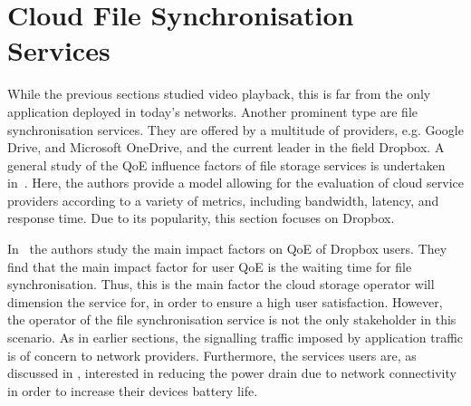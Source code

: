 \section{Cloud File Synchronisation Services}\label{sec:application:cloud_file_synchronisation}

\newcommand{\dropbox}{\emph{DropBox}\xspace}
\newcommand{\imageFileSize}{\ensuremath{S_I}\xspace}
\newcommand{\imageArrivalRate}{\ensuremath{\lambda_I}\xspace}
\newcommand{\panTransferRate}{\ensuremath{B_{P}}\xspace}
\newcommand{\interarrivaltime}{\ensuremath{t_I}\xspace}
\newcommand{\clientpreparationtime}{\ensuremath{C}\xspace}
\newcommand{\uploadbandwidth}{\ensuremath{B_U}\xspace}
\newcommand{\idleThreshold}{\ensuremath{\tau}\xspace}
\newcommand{\serverpreparationtime}{\ensuremath{S}\xspace}
\newcommand{\downloadbandwidth}{\ensuremath{B_D}\xspace}
\newcommand{\startupDelay}{\ensuremath{\sigma}\xspace}
\newcommand{\sojournTime}{\ensuremath{\Sigma}\xspace}
\newcommand{\relativeDisconnectedTime}{\ensuremath{\Delta}\xspace}
\newcommand{\connectionCount}{\ensuremath{K}\xspace}
\newcommand{\algointerval}{\emph{Interval}\xspace}
\newcommand{\thresholdInterval}{\ensuremath{T_i}\xspace}
\newcommand{\thresholdSize}{\ensuremath{T_s}\xspace}
\newcommand{\thresholdNormalised}{\ensuremath{T_n}\xspace}
\newcommand{\algosize}{\emph{Size}\xspace}
\newcommand{\algoimmediate}{\emph{Immediate}\xspace}
\newcommand{\numberOfFiles}{\ensuremath{n}}

While the previous sections studied video playback, this is far from the only application deployed in today's networks.
Another prominent type are file synchronisation services.
They are offered by a multitude of providers, e.g. Google Drive, and Microsoft OneDrive, and the current leader in the field Dropbox.
A general study of the \gls{QoE} influence factors of file storage services is undertaken in~\cite{Qian2011b}.
Here, the authors provide a model allowing for the evaluation of cloud service providers according to a variety of metrics, including bandwidth, latency, and response time.
Due to its popularity, this section focuses on Dropbox.

In~\cite{Amrehm2013} the authors study the main impact factors on \gls{QoE} of Dropbox users.
They find that the main impact factor for user \gls{QoE} is the waiting time for file synchronisation.
Thus, this is the main factor the cloud storage operator will dimension the service for, in order to ensure a high user satisfaction. 
However, the operator of the file synchronisation service is not the only stakeholder in this scenario.
As in earlier sections, the signalling traffic imposed by application traffic is of concern to network providers.
Furthermore, the services users are, as discussed in , interested in reducing the power drain due to network connectivity in order to increase their devices battery life.

